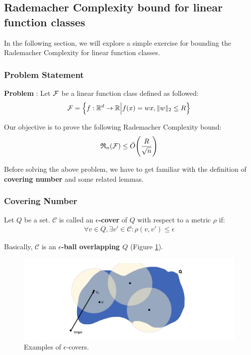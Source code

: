 \subsection{Rademacher Complexity bound for linear function classes}
In the following section, we will explore a simple exercise for bounding the Rademacher Complexity for linear function classes.

\subsubsection{Problem Statement}
\label{sec:rc_bound_lin_func_problem}

\textbf{Problem} : Let $\mathcal{F}$ be a linear function class defined as followed:
\begin{align*}
    \mathcal{F} = \Big\{ 
        f:\mathbb{R}^d \to \mathbb{R} \Big| f(x) = wx, \|w\|_2 \le R
     \Big\}
\end{align*}

\noindent Our objective is to prove the following Rademacher Complexity bound:
\begin{align*}
    \mathfrak{R}_n(\mathcal{F}) \le \tilde O \Bigg( 
        \frac{R}{\sqrt{n}}
     \Bigg)
\end{align*}

\noindent Before solving the above problem, we have to get familiar with the definition of \textbf{covering number} and some related lemmas.


\subsubsection{Covering Number}
\begin{definition}
    Let $Q$ be a set. $\mathcal{C}$ is called an \textbf{$\epsilon$-cover} of $Q$ with respect to a metric $\rho$ if:
    \begin{align*}
        \forall v \in Q, \exists v'\in \mathcal{C} : \rho(v, v') \le \epsilon
    \end{align*}

    \noindent Basically, $\mathcal{C}$ is an \textbf{$\epsilon$-ball overlapping $Q$} (Figure \ref{fig:epsilon_cover}).
\end{definition}

\begin{figure}[ht]
    \centering
    \includegraphics[width=\textwidth]{figures/epsilon_cover.png}
    \caption{Examples of $\epsilon$-covers.}
    \label{fig:epsilon_cover}
\end{figure}

